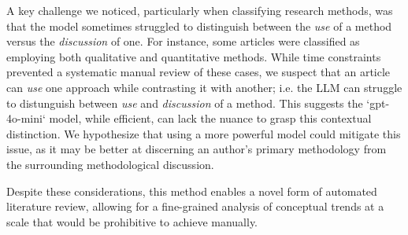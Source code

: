 A key challenge we noticed, particularly when classifying research methods, was
that the model sometimes struggled to distinguish between the \emph{use} of a
method versus the \emph{discussion} of one. For instance, some articles were
classified as employing both qualitative and quantitative methods. While time
constraints prevented a systematic manual review of these cases, we suspect that
an article can \emph{use} one approach while contrasting it with another; i.e.
the LLM can struggle to distunguish between \emph{use} and \emph{discussion} of
a method. This suggests the `gpt-4o-mini` model, while efficient, can lack the
nuance to grasp this contextual distinction. We hypothesize that using a more
powerful model could mitigate this issue, as it may be better at discerning an
author's primary methodology from the surrounding methodological discussion.

Despite these considerations, this method enables a novel form of automated
literature review, allowing for a fine-grained analysis of conceptual trends at
a scale that would be prohibitive to achieve manually.
